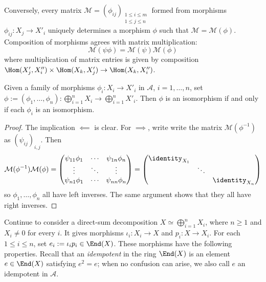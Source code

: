 Conversely, every matrix
$\mathcal{M}=(\phi_{ij})_{\substack{1\leq i\leq m\\1\leq j\leq n}}$
formed from morphisms $\phi_{ij}:X_j\to X'_i$ uniquely determines a
morphism $\phi$ such that $\mathcal{M}=\mathcal{M}(\phi)$. Composition of
morphisms agrees with matrix multiplication:
\[ \mathcal{M}(\psi\phi) = \mathcal{M}(\psi) \mathcal{M}(\phi) \]
where multiplication of matrix entries is given by composition
$\Hom(X'_j,X''_i)\times\Hom(X_k,X'_j)\to\Hom(X_k,X''_i)$.

\begin{lemma}\label{prop:isomorphism-matrix}
	Given a family of morphisms $\phi_i:X_i\to X'_i$ in $\mathcal{A}$,
	$i=1,\ldots,n$, set
	$\phi:=(\phi_1,\ldots,\phi_n):\bigoplus_{i=1}^nX_i\to
	\bigoplus_{i=1}^nX'_i$. Then $\phi$ is an isomorphism if and only if each
	$\phi_i$ is an isomorphism.
\end{lemma}
\begin{proof}
	The implication $\impliedby$ is clear. For $\implies$, write
	write the matrix $\mathcal{M}(\phi^{-1})$ as $(\psi_{ij})_{i,j}$. Then
	\[ \mathcal{M}(\phi^{-1}) \mathcal{M}(\phi) = \begin{pmatrix}
		\psi_{11} \phi_1 & \cdots & \psi_{1n} \phi_n \\
		\vdots & \ddots & \vdots \\
		\psi_{n1} \phi_1 & \cdots & \psi_{nn} \phi_n
	\end{pmatrix} = \begin{pmatrix}
		\identity_{X_1} & & \\
		& \ddots & \\
		& & \identity_{X_n}
	\end{pmatrix}\]
	so $\phi_1,\ldots,\phi_n$ all have left inverses. The same argument shows
	that they all have right inverses.
\end{proof}

Continue to consider a direct-sum decomposition
$X\simeq\bigoplus_{i=1}^nX_i$, where $n\geq1$ and $X_i\neq0$ for every
$i$. It gives morphisms $\iota_i:X_i\to X$ and $p_i:X\to X_i$. For each
$1\leq i\leq n$, set $e_i:=\iota_ip_i\in\End(X)$. These morphisms have the
following properties. Recall that an \emph{idempotent} in the ring $\End(X)$
is an element $e\in\End(X)$ satisfying $e^2=e$; when no confusion can arise,
we also call $e$ an idempotent in $\mathcal{A}$.

